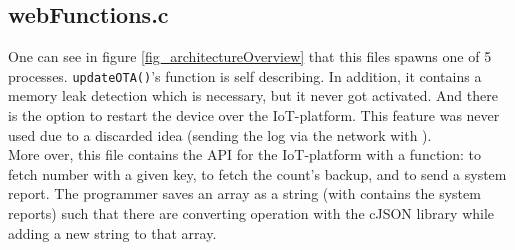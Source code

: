 \subsection{webFunctions.c}
One can see in figure \ref{fig_architectureOverview} that this files spawns one of 5 processes.
\verb!updateOTA()!'s function is self describing. In addition, it contains a memory leak detection
which is necessary, but it never got activated. And there is the option to restart the device
over the IoT-platform. This feature was never used due to a discarded idea (sending the log
via the network with \cite{gitSendLog}).\\
More over, this file contains the API for the IoT-platform with a function: to fetch number with a
given key, to fetch the count's backup, and to send a system report. The programmer saves an array
as a string (with contains the system reports)
such that there are converting operation with the cJSON library while adding a new
string to that array.


